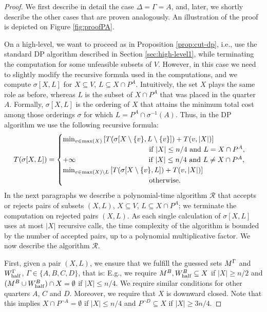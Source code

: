 \documentclass{article}
\theoremstyle{definition}
\begin{document}
\begin{proof}
We first describe in detail the case $\Delta=\Gamma=A$, and, later, we shortly describe the other cases that are proven analogously.
An illustration of the proof is depicted on Figure \ref{fig:proofPA}.

On a high-level, we want to proceed as in Proposition \ref{prop:cut-dp}, i.e., use the standard DP algorithm described in Section \ref{sec:high-level1},
while terminating the computation for some unfeasible subsets of $V$.
However, in this case we need to slightly modify the recursive formula used in the computations, and we compute $\sigma[X,L]$ for $X \subseteq V$, $L \subseteq X \cap P^A$.
Intuitively, the set $X$ plays the same role as before, whereas $L$ is the subset of $X \cap P^A$ that was placed in the quarter $A$. Formally, $\sigma[X,L]$ is the ordering of $X$ that attains the minimum total cost among those orderings $\sigma$ for which $L=P^A\cap \sigma^{-1}(A)$.
Thus, in the DP algorithm we use the following recursive formula:
\begin{equation*}
T(\sigma[X,L]) =
\begin{cases}
\min_{v\in \max(X)} \left[T(\sigma[X \setminus \{v\}, L \setminus \{v\}]) + T(v,|X|)\right] \\
    \qquad\qquad\qquad\qquad\qquad\qquad \textrm{if } |X| \leq n/4 \textrm{ and } L=X \cap P^A, \\
+\infty\,\qquad\qquad\qquad\qquad\qquad \textrm{if } |X| \leq n/4 \textrm { and } L \neq X \cap P^A, \\
\min_{v\in \max(X) \setminus L} \left[T(\sigma[X \setminus \{v\}, L]) + T(v,|X|)\right] \\
    \qquad\qquad\qquad\qquad\qquad\qquad \textrm{otherwise.}
\end{cases}
\end{equation*}
In the next paragraphs we describe a polynomial-time algorithm $\mathcal{R}$ that accepts or rejects pairs of subsets $(X,L)$, $X \subseteq V$, $L \subseteq X \cap P^A$;
we terminate the computation on rejected pairs $(X,L)$.
As each single calculation of $\sigma[X,L]$ uses at most $|X|$ recursive calls, the time complexity of the algorithm is bounded by the number of accepted pairs, up to a polynomial multiplicative factor.
We now describe the algorithm $\mathcal{R}$.

First, given a pair $(X,L)$, we ensure that we fulfill the guessed sets $M^\Gamma$ and $W_{\mathrm{half}}^\Gamma$, $\Gamma \in \{A,B,C,D\}$, that is:
E.g., we require $M^B, W_{\mathrm{half}}^B \subseteq X$ if $|X| \geq n/2$
and $(M^B \cup W_{\mathrm{half}}^B) \cap X = \emptyset$ if $|X| \leq n/4$. We require similar conditions for other quarters $A$, $C$ and $D$. Moreover, we require that $X$ is downward closed. Note that this implies $X \cap P^{\neg A} = \emptyset$ if $|X| \leq n/4$ and $P^{\neg D} \subseteq X$ if $|X| \geq 3n/4$.


\end{proof}
\end{document}
